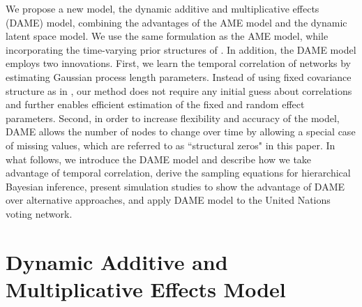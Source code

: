 \documentclass[a4paper]{article}
\begin{document}
		We propose a new model, the dynamic additive and multiplicative effects (DAME) model, combining the advantages of the AME model and the dynamic latent space model. We use the same formulation as the AME model, while incorporating the time-varying prior structures of \cite{durante2013nonparametric}. In addition, the DAME model employs two innovations. First, we learn the temporal correlation of networks by estimating Gaussian process length parameters. Instead of using fixed covariance structure as in  \cite{durante2013nonparametric,durante2014bayesian}, our method does not require any initial guess about correlations and further enables efficient estimation of the fixed and random effect parameters. Second, in order to increase flexibility and accuracy of the model, DAME allows the number of nodes to change over time by allowing a special case of missing values, which are referred to as ``structural zeros" in this paper. In what follows, we introduce the DAME model and describe how we take advantage of temporal correlation, derive the sampling equations for hierarchical Bayesian inference, present simulation studies to show the advantage of DAME over alternative approaches, and apply DAME model to the United Nations voting network.
		\section{Dynamic Additive and Multiplicative Effects Model}\label{sec: DAME}
\end{document}
